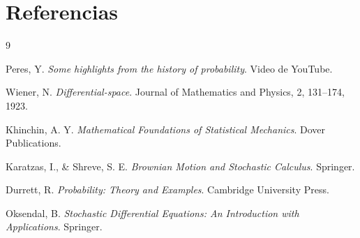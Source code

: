 \documentclass[12pt]{article}
\begin{document}
\section{Referencias}

\begin{thebibliography}{9}

Peres, Y. 
\textit{Some highlights from the history of probability}. 
Video de YouTube.

Wiener, N. 
\textit{Differential-space}. 
Journal of Mathematics and Physics, 2, 131--174, 1923.

Khinchin, A. Y. 
\textit{Mathematical Foundations of Statistical Mechanics}. 
Dover Publications.

Karatzas, I., \& Shreve, S. E. 
\textit{Brownian Motion and Stochastic Calculus}. 
Springer.

Durrett, R. 
\textit{Probability: Theory and Examples}. 
Cambridge University Press.

Oksendal, B. 
\textit{Stochastic Differential Equations: An Introduction with Applications}. 
Springer.

\end{thebibliography}
\end{document}
